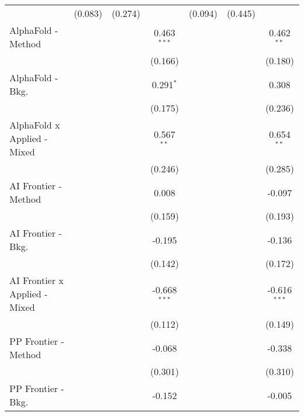 \begin{tabular}{lcccccc}
                                  & (0.083)       & (0.274)       &                & (0.094)       & (0.445)       &   \\   
   AlphaFold - Method             &               &               & 0.463$^{***}$  &               &               & 0.462$^{**}$\\   
                                  &               &               & (0.166)        &               &               & (0.180)\\   
   AlphaFold - Bkg.               &               &               & 0.291$^{*}$    &               &               & 0.308\\   
                                  &               &               & (0.175)        &               &               & (0.236)\\   
   AlphaFold x Applied - Mixed    &               &               & 0.567$^{**}$   &               &               & 0.654$^{**}$\\   
                                  &               &               & (0.246)        &               &               & (0.285)\\   
   AI Frontier - Method           &               &               & 0.008          &               &               & -0.097\\   
                                  &               &               & (0.159)        &               &               & (0.193)\\   
   AI Frontier - Bkg.             &               &               & -0.195         &               &               & -0.136\\   
                                  &               &               & (0.142)        &               &               & (0.172)\\   
   AI Frontier x Applied - Mixed  &               &               & -0.668$^{***}$ &               &               & -0.616$^{***}$\\   
                                  &               &               & (0.112)        &               &               & (0.149)\\   
   PP Frontier - Method           &               &               & -0.068         &               &               & -0.338\\   
                                  &               &               & (0.301)        &               &               & (0.310)\\   
   PP Frontier - Bkg.             &               &               & -0.152         &               &               & -0.005\\   

\end{tabular}
